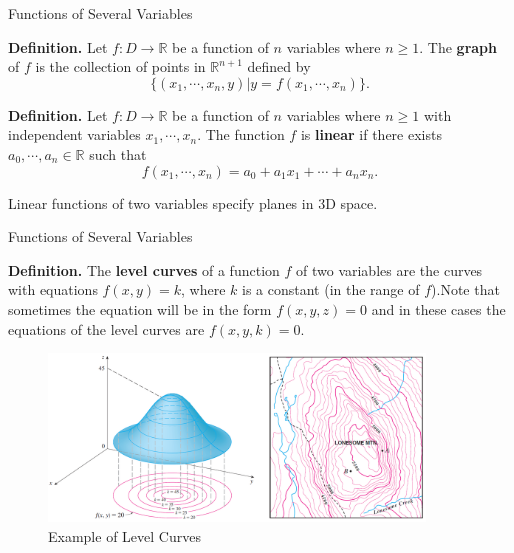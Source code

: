 \documentclass{beamer}
\begin{document}
    \begin{frame}[t]{Functions of Several Variables}
        \begin{block}
            \par \textbf{Definition.} Let $f: D \to \mathbb{R}$ be a function of $n$ variables where $n \geq 1$. The \textbf{graph} of $f$ is the collection of points in $\mathbb{R}^{n+1}$ defined by 
            \begin{equation*}
                \{ (x_1, \cdots, x_n, y)| y = f(x_1, \cdots, x_n) \} .
            \end{equation*}
        \end{block}

        \begin{block}
            \par \textbf{Definition.} Let $f: D \to \mathbb{R}$ be a function of $n$ variables where $n \geq 1$ with independent variables $x_1, \cdots, x_n$. The function $f$ is \textbf{linear} if there exists $a_0, \cdots, a_n \in \mathbb{R}$ such that 
            \begin{equation*}
                f(x_1, \cdots, x_n) = a_0 + a_1 x_1 + \cdots + a_n x_n .
            \end{equation*}

            \par Linear functions of two variables specify planes in 3D space. 
        \end{block}
    \end{frame}

    \begin{frame}[t]{Functions of Several Variables}
        \begin{block}
            \par \textbf{Definition.} The \textbf{level curves} of a function $f$ of two variables are the curves with equations $f(x,y) = k$, where $k$ is a constant (in the range of $f$).Note that sometimes the equation will be in the form $f(x,y,z)=0$ and in these cases the equations of the level curves are $f(x,y,k)=0$.
        \end{block}
        
        \begin{figure}
            \centering 
            \includegraphics[width = 10cm]{f4}
            \caption{Example of Level Curves}
        \end{figure}
    \end{frame}
\end{document}
